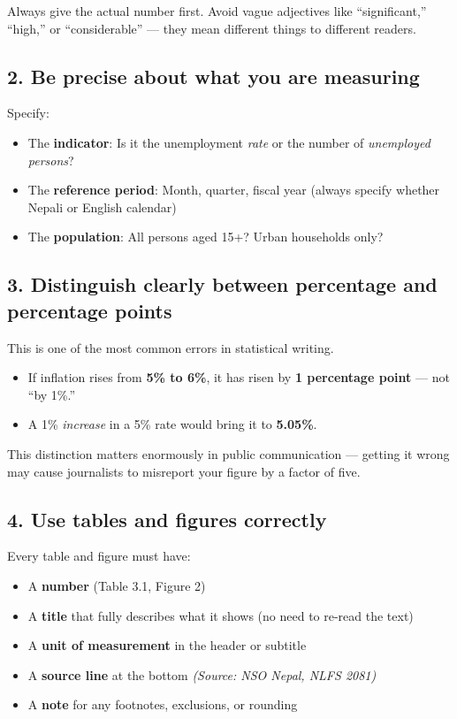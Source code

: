 \documentclass[11pt,a4paper,oneside]{book}
\begin{document}
Always give the actual number first. Avoid vague adjectives like ``significant,'' ``high,'' or ``considerable'' --- they mean different things to different readers.

\subsection*{2. Be precise about what you are measuring}

Specify:
\begin{itemize}
    \item The \textbf{indicator}: Is it the unemployment \emph{rate} or the number of \emph{unemployed persons}?
    \item The \textbf{reference period}: Month, quarter, fiscal year (always specify whether Nepali or English calendar)
    \item The \textbf{population}: All persons aged 15+? Urban households only?
\end{itemize}

\subsection*{3. Distinguish clearly between percentage and percentage points}

This is one of the most common errors in statistical writing.

\begin{itemize}
    \item If inflation rises from \textbf{5\% to 6\%}, it has risen by \textbf{1 percentage point} --- not ``by 1\%.''
    \item A 1\% \emph{increase} in a 5\% rate would bring it to \textbf{5.05\%}.
\end{itemize}

This distinction matters enormously in public communication --- getting it wrong may cause journalists to misreport your figure by a factor of five.

\subsection*{4. Use tables and figures correctly}

Every table and figure must have:
\begin{itemize}
    \item A \textbf{number} (Table 3.1, Figure 2)
    \item A \textbf{title} that fully describes what it shows (no need to re-read the text)
    \item A \textbf{unit of measurement} in the header or subtitle
    \item A \textbf{source line} at the bottom \emph{(Source: NSO Nepal, NLFS 2081)}
    \item A \textbf{note} for any footnotes, exclusions, or rounding
\end{itemize}
\end{document}
